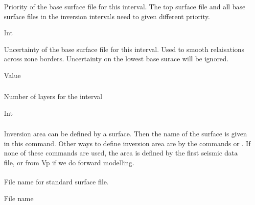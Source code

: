  
 \slist
   \item \Description Priority of the base surface file for this interval. The top surface file and all base surface files in the inversion intervals need to given different priority.
   \item \Argument Int
   \item \Default
 \elist

 
 \slist
   \item \Description Uncertainty of the base surface file for this interval. Used to smooth relaisations across zone borders. Uncertainty on the lowest base surace will be ignored. 
   \item \Argument Value
   \item {}
 \elist

\subparagraph{ \necessary} 
 \slist
   \item \Description Number of layers for the interval
   \item \Argument Int
   \item \Default
 \elist

\subsubsection{}
 \slist
   \item \Description Inversion area can be defined by a surface. Then
     the name of the surface is given in this command. Other ways to
     define inversion area are by the commands  or
     . If none of these commands are
     used, the area is defined by the first seismic data file, or from
     Vp if we do forward modelling.
   \item \Argument
   \item \Default
 \elist

\paragraph{}
\slist
   \item \Description File name for standard surface file.
   \item \Argument File name
   \item \Default
 \elist

